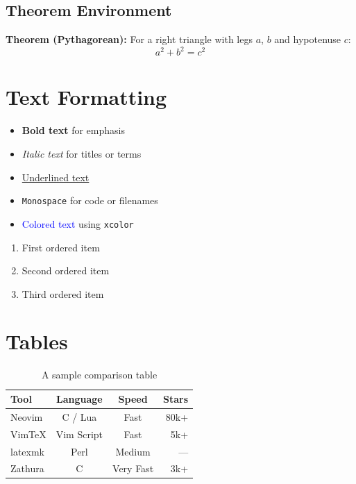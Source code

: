 \documentclass[12pt, a4paper]{article}
\begin{document}
\subsection{Theorem Environment}

\textbf{Theorem (Pythagorean):} For a right triangle with legs $a$, $b$
and hypotenuse $c$:
\[
  a^2 + b^2 = c^2
\]

\section{Text Formatting}

\begin{itemize}
  \item \textbf{Bold text} for emphasis
  \item \textit{Italic text} for titles or terms
  \item \underline{Underlined text}
  \item \texttt{Monospace} for code or filenames
  \item \textcolor{blue}{Colored text} using \texttt{xcolor}
\end{itemize}

\begin{enumerate}[label=\arabic*.]
  \item First ordered item
  \item Second ordered item
  \item Third ordered item
\end{enumerate}

\section{Tables}

\begin{table}[h!]
  \centering
  \caption{A sample comparison table}
  \begin{tabular}{@{} l c c r @{}}
    \toprule
    \textbf{Tool}   & \textbf{Language} & \textbf{Speed} & \textbf{Stars} \\
    \midrule
    Neovim          & C / Lua           & Fast           & 80k+           \\
    VimTeX          & Vim Script        & Fast           & 5k+            \\
    latexmk         & Perl              & Medium         & ---            \\
    Zathura         & C                 & Very Fast      & 3k+            \\
    \bottomrule
  \end{tabular}
\end{table}
\end{document}
